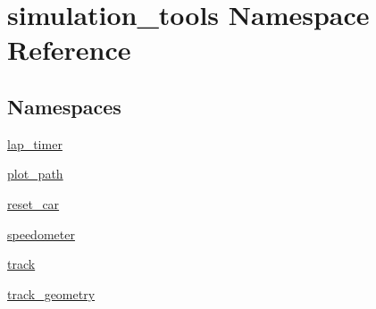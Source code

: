 \hypertarget{namespacesimulation__tools}{}\section{simulation\+\_\+tools Namespace Reference}
\label{namespacesimulation__tools}
\subsection*{Namespaces}
\begin{DoxyCompactItemize}
\item 
 \hyperlink{namespacesimulation__tools_1_1lap__timer}{lap\+\_\+timer}
\item 
 \hyperlink{namespacesimulation__tools_1_1plot__path}{plot\+\_\+path}
\item 
 \hyperlink{namespacesimulation__tools_1_1reset__car}{reset\+\_\+car}
\item 
 \hyperlink{namespacesimulation__tools_1_1speedometer}{speedometer}
\item 
 \hyperlink{namespacesimulation__tools_1_1track}{track}
\item 
 \hyperlink{namespacesimulation__tools_1_1track__geometry}{track\+\_\+geometry}
\end{DoxyCompactItemize}

